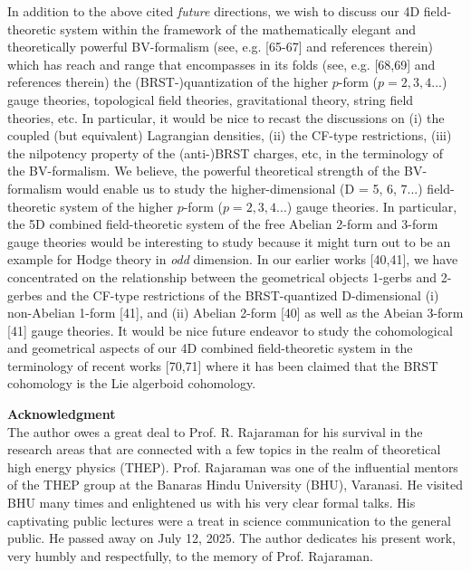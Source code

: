 \documentclass[12pt]{article}
\begin{document}
In addition to the above cited {\it future} directions, we wish to discuss our 4D field-theoretic system within the framework of the 
mathematically elegant and theoretically powerful  BV-formalism (see, e.g. [65-67] and references therein) which has reach and range that
encompasses in its folds (see, e.g. [68,69] and references therein)
the (BRST-)quantization of the higher $p$-form ($p = 2, 3, 4... $) gauge theories, topological field theories,
gravitational theory, string field theories, etc. In particular, it would be nice to recast  the discussions on (i) the coupled
(but equivalent) Lagrangian densities, (ii) the CF-type restrictions, (iii) the nilpotency property of the 
(anti-)BRST charges, etc, in the terminology of the BV-formalism. We believe, the powerful theoretical strength of the BV-formalism
would enable us to study the higher-dimensional (D = 5, 6, 7...) field-theoretic system of the higher $p$-form ($p = 2, 3, 4... $)
gauge theories. In particular, the 5D combined field-theoretic system of the free Abelian 2-form and 3-form  gauge theories 
would be interesting to study because it might turn out to be an example for Hodge theory in {\it odd} dimension. In our earlier works [40,41],
we have concentrated on the relationship between the geometrical objects 1-gerbs and 2-gerbes and the CF-type restrictions 
of the BRST-quantized D-dimensional (i) non-Abelian 1-form [41], and (ii) Abelian 2-form [40] as well as the Abeian 3-form [41] gauge theories. 
It would be nice future endeavor to study the cohomological and geometrical aspects of
our 4D combined field-theoretic system in the terminology of recent works [70,71] where it has been claimed that the  BRST cohomology is
the Lie algerboid cohomology. \\



\vskip 0.3cm

\noindent
{\bf Acknowledgment} \\


\noindent
The author owes a great deal to Prof. R. Rajaraman for his survival in the research areas 
that are connected with a few topics in the realm of theoretical high energy physics (THEP).
Prof. Rajaraman was one of the influential mentors of the THEP group at the Banaras Hindu University (BHU), Varanasi. He visited  BHU many times and
enlightened us with his very clear formal talks. His captivating  public lectures
were a treat in science communication to the general public.
He passed away on July 12, 2025. The author dedicates his present work, very
humbly and respectfully, to the memory of  Prof. Rajaraman. \\
\end{document}
